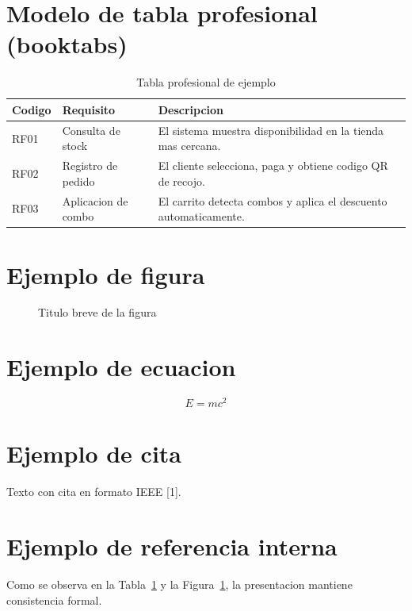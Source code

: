 \section{Modelo de tabla profesional (booktabs)}
\begin{table}[htbp]
\centering
\caption{Tabla profesional de ejemplo}
\label{tab:tabla_profesional}
\begin{tabular}{@{}p{2cm}p{4cm}p{5.2cm}@{}}
\toprule
\textbf{Codigo} & \textbf{Requisito} & \textbf{Descripcion} \\
\midrule
RF01 & Consulta de stock & El sistema muestra disponibilidad en la tienda mas cercana. \\
RF02 & Registro de pedido & El cliente selecciona, paga y obtiene codigo QR de recojo. \\
RF03 & Aplicacion de combo & El carrito detecta combos y aplica el descuento automaticamente. \\
\bottomrule
\end{tabular}
\end{table}

\section{Ejemplo de figura}
\begin{figure}[htbp]
\centering
\caption{Titulo breve de la figura}
\label{fig:ejemplo}
\end{figure}

\section{Ejemplo de ecuacion}
\begin{equation}
E = mc^2
\end{equation}

\section{Ejemplo de cita}
Texto con cita en formato IEEE [1].

\section{Ejemplo de referencia interna}
Como se observa en la Tabla~\ref{tab:tabla_profesional} y la Figura~\ref{fig:ejemplo},
la presentacion mantiene consistencia formal.
